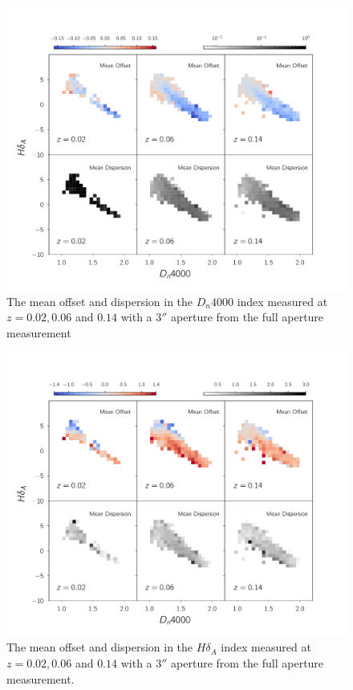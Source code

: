 \begin{figure}
\includegraphics[width=\textwidth]{figures/dn4000_full_aperture_comparisons.pdf}
\caption[The mean offset and dispersion in the $D_{n}4000$ index measured 
at $z = 0.02,0.06$ and $0.14$ with a $3''$ aperture from the full aperture measurement]{ The mean offset and dispersion in the $D_{n}4000$ index measured at $z = 0.02,0.06$ and $0.14$ with a $3''$ aperture from the full aperture measurement
\label{fig:offset_d4000}}
\end{figure}

\begin{figure}
\includegraphics[width=\textwidth]{figures/hdelta_full_aperture_comparisons.pdf}
\caption[The mean offset and dispersion in the $H\delta_{A}$
 index measured at $z = 0.02,0.06$ and $0.14$ with a $3''$ 
 aperture from the full aperture measurement ]
 {The mean offset and dispersion in the $H\delta_{A}$ 
 index measured at $z = 0.02,0.06$ and $0.14$ 
 with a $3''$ aperture from the full aperture measurement.
\label{fig:offset_hdelta}}
\end{figure}

